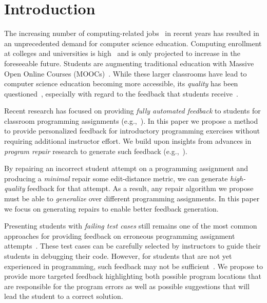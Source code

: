 \section{Introduction}
\label{sec:intro}

The increasing number of computing-related jobs~\citep[][]{compsci-demand}
in recent years has resulted in an unprecedented
demand for computer science education.  Computing enrollment at colleges
and universities is high~\citep[][]{compsci-classes} and is only projected
to increase in the foreseeable future. Students are augmenting traditional
education with Massive Open Online Courses (MOOCs)~\citep[][]{moocs}.
While these larger classrooms have lead to computer science education
becoming more accessible, its \emph{quality} has been
questioned~\cite{FIXME}, especially with regard to the feedback that
students receive~\cite{FIXME}.

Recent research has focused on providing \emph{fully automated feedback} to
students for classroom programming assignments (e.g.,~\cite{FIXME,FIXME}). In
this paper we propose a method to provide personalized
feedback for introductory programming exercises without requiring
additional instructor effort. We build upon insights from advances in
\emph{program repair} research to generate such feedback
(e.g.,~\cite{FIXME,FIXME}).

By repairing an incorrect student attempt on a programming assignment and
producing a \emph{minimal} repair \wrt some edit-distance metric,
we can generate \emph{high-quality}
feedback for that attempt. As a result, any repair algorithm we propose must be
able to \emph{generalize} over different programming assignments.
In this paper we focus on generating
repairs to enable better feedback generation.

Presenting students with \emph{failing test cases} still remains one of the most
common approaches for providing feedback on erroneous programming assignment
attempts~\cite{FIXME,FIXME}. These test cases can be carefully selected by instructors to guide
their students in debugging their code. However, for students that are not yet
experienced in programming, such feedback may not be
sufficient~\cite{FIXME}. We propose to provide
more targeted feedback highlighting both possible program
locations that are responsible for the program errors as well as possible
suggestions that will lead the student to a correct solution.

